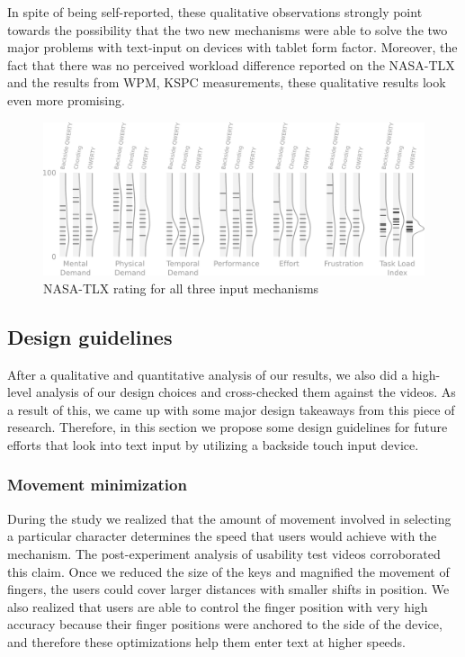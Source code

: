 In spite of being self-reported, these qualitative observations strongly point towards the possibility that the two new mechanisms were able to solve the two major problems with text-input on devices with tablet form factor. Moreover, the fact that there was no perceived workload difference reported on the NASA-TLX and the results from WPM, KSPC measurements, these qualitative results look even more promising.

\begin{figure}
    \includegraphics[width=\textwidth]{Figures/hash_and_densities_index.pdf} 
    \caption{NASA-TLX rating for all three input mechanisms}
    \label{fig:tlx-ratings}
\end{figure}

\subsection{Design guidelines}

After a qualitative and quantitative analysis of our results, we also did a high-level analysis of our design choices and cross-checked them against the videos. As a result of this, we came up with some major design takeaways from this piece of research. Therefore, in this section we propose some design guidelines for future efforts that look into text input by utilizing a backside touch input device. 

\subsubsection{Movement minimization}

During the study we realized that the amount of movement involved in selecting a particular character determines the speed that users would achieve with the mechanism. The post-experiment analysis of usability test videos corroborated this claim. Once we reduced the size of the keys and magnified the movement of fingers, the users could cover larger distances with smaller shifts in position. We also realized that users are able to control the finger position with very high accuracy because their finger positions were anchored to the side of the device, and therefore these optimizations help them enter text at higher speeds.

